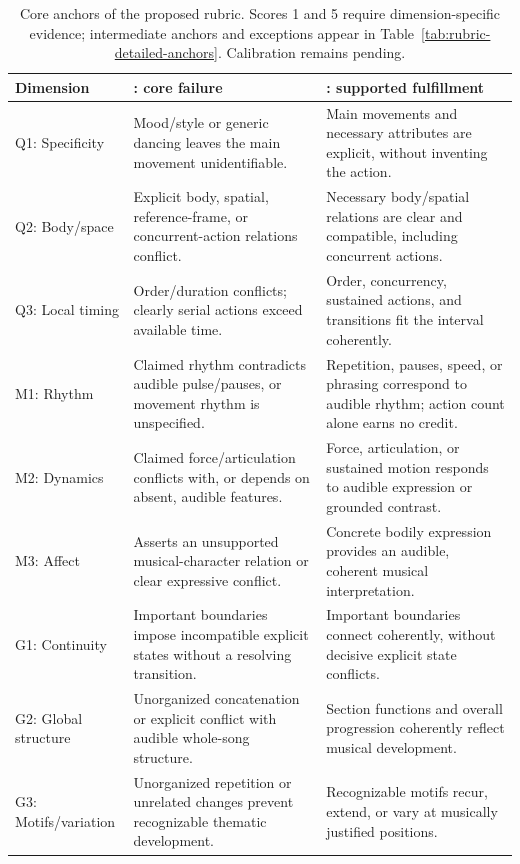 \begin{table}[t]
\centering
\caption{Core anchors of the proposed rubric. Scores 1 and 5 require dimension-specific evidence; intermediate anchors and exceptions appear in Table~\ref{tab:rubric-detailed-anchors}. Calibration remains pending.}
\label{tab:rubric-core-anchors}
\begingroup\small
\setlength{\tabcolsep}{4pt}
\renewcommand{\arraystretch}{1.10}
\begin{tabular}{@{}>{\raggedright\arraybackslash}p{}>{\raggedright\arraybackslash}p{}>{\raggedright\arraybackslash}p{}@{}}
\toprule
Dimension & 1: core failure & 5: supported fulfillment \\
\midrule
Q1: Specificity & Mood/style or generic dancing leaves the main movement unidentifiable. & Main movements and necessary attributes are explicit, without inventing the action. \\
Q2: Body/space & Explicit body, spatial, reference-frame, or concurrent-action relations conflict. & Necessary body/spatial relations are clear and compatible, including concurrent actions. \\
Q3: Local timing & Order/duration conflicts; clearly serial actions exceed available time. & Order, concurrency, sustained actions, and transitions fit the interval coherently. \\
M1: Rhythm & Claimed rhythm contradicts audible pulse/pauses, or movement rhythm is unspecified. & Repetition, pauses, speed, or phrasing correspond to audible rhythm; action count alone earns no credit. \\
M2: Dynamics & Claimed force/articulation conflicts with, or depends on absent, audible features. & Force, articulation, or sustained motion responds to audible expression or grounded contrast. \\
M3: Affect & Asserts an unsupported musical-character relation or clear expressive conflict. & Concrete bodily expression provides an audible, coherent musical interpretation. \\
\midrule
G1: Continuity & Important boundaries impose incompatible explicit states without a resolving transition. & Important boundaries connect coherently, without decisive explicit state conflicts. \\
G2: Global structure & Unorganized concatenation or explicit conflict with audible whole-song structure. & Section functions and overall progression coherently reflect musical development. \\
G3: Motifs/variation & Unorganized repetition or unrelated changes prevent recognizable thematic development. & Recognizable motifs recur, extend, or vary at musically justified positions. \\
\bottomrule
\end{tabular}
\endgroup
\end{table}
